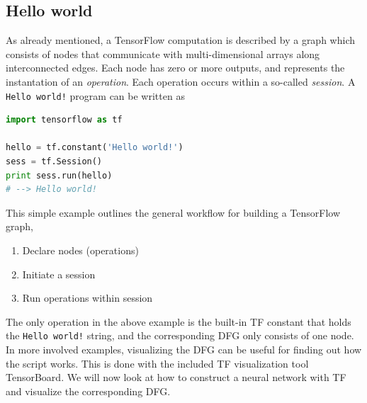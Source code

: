 \documentclass[twoside,english]{uiofysmaster}
\begin{document}
\subsection{Hello world}
As already mentioned, a TensorFlow computation
is described by a graph which consists of nodes
that communicate with multi-dimensional arrays along
interconnected edges. Each node has zero or more
outputs, and represents the instantation
of an \textit{operation}. Each operation
occurs within a so-called \textit{session}. 
A \texttt{Hello world!} program can be written as
\begin{lstlisting}[language=python]
import tensorflow as tf

hello = tf.constant('Hello world!')
sess = tf.Session()
print sess.run(hello)
# --> Hello world!
\end{lstlisting}
This simple example outlines the general
workflow for building a TensorFlow graph,
\begin{enumerate}
 \item Declare nodes (operations)
 \item Initiate a session
 \item Run operations within session
\end{enumerate}
The only operation in the above example
is the built-in TF constant that holds the 
\texttt{Hello world!} string, and the 
corresponding DFG only consists of one node. 
In more involved examples, visualizing 
the DFG can be useful for finding out how 
the script works. This is done with the 
included TF visualization tool TensorBoard.
We will now look at how to construct a neural network with TF and
visualize the corresponding DFG. 
\end{document}
